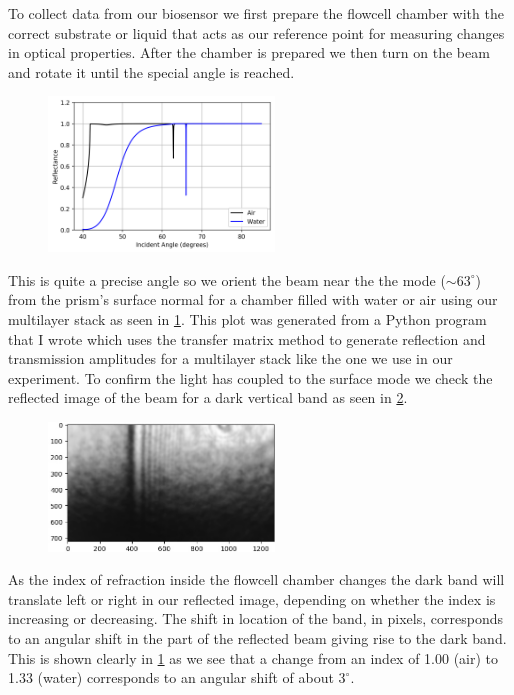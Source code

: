 \documentclass{article}
\begin{document}
To collect data from our biosensor we first prepare the flowcell chamber with the correct substrate or liquid that acts as our reference point for measuring changes in optical properties. After the chamber is prepared we then turn on the beam and rotate it until the special angle is reached. 

\begin{figure}
    \includegraphics[width=6cm]{reflectivity_dip.png}
    \label{fig:SEW}
\end{figure}

This is quite a precise angle so we orient the beam near the the mode ($\sim 63^{\circ}$) from the prism's surface normal for a chamber filled with water or air using our multilayer stack as seen in \ref{fig:SEW}. This plot was generated from a Python program that I wrote which uses the transfer matrix method to generate reflection and transmission amplitudes for a multilayer stack like the one we use in our experiment. To confirm the light has coupled to the surface mode we check the reflected image of the beam for a dark vertical band as seen in \ref{fig:darkband}.

\begin{figure}
	\includegraphics[width=6cm]{darkband.png}
    \label{fig:darkband}
\end{figure}

As the index of refraction inside the flowcell chamber changes the dark band will translate left or right in our reflected image, depending on whether the index is increasing or decreasing. The shift in location of the band, in pixels, corresponds to an angular shift in the part of the reflected beam giving rise to the dark band. This is shown clearly in \ref{fig:SEW} as we see that a change from an index of 1.00 (air) to 1.33 (water) corresponds to an angular shift  of about $3^\circ$.
\end{document}
